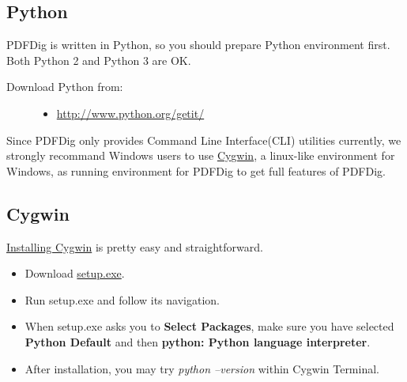 \documentclass[letterpaper,10pt,oneside]{sphinxmanual}
\begin{document}
\subsection{Python}
\label{tutorial:python}
PDFDig is written in Python, so you should prepare Python environment first. Both Python 2 and Python 3 are OK.
\begin{description}
\item[{Download Python from:}] \leavevmode\begin{itemize}
\item {} 
\href{http://www.python.org/getit/}{http://www.python.org/getit/}

\end{itemize}

\end{description}

Since PDFDig only provides Command Line Interface(CLI) utilities currently, we strongly recommand Windows users to use \href{http://www.cygwin.com/}{Cygwin}, a linux-like environment for Windows, as running environment for PDFDig to get full features of PDFDig.


\subsection{Cygwin}
\label{tutorial:id1}
\href{http://cygwin.com/install.html}{Installing Cygwin} is pretty easy and straightforward.
\begin{itemize}
\item {} 
Download \href{http://cygwin.com/setup.exe}{setup.exe}.

\item {} 
Run setup.exe and follow its navigation.

\item {} 
When setup.exe asks you to \textbf{Select Packages}, make sure you have selected \textbf{Python Default} and then \textbf{python: Python language interpreter}.

\item {} 
After installation, you may try \emph{python --version} within Cygwin Terminal.

\end{itemize}
\end{document}
